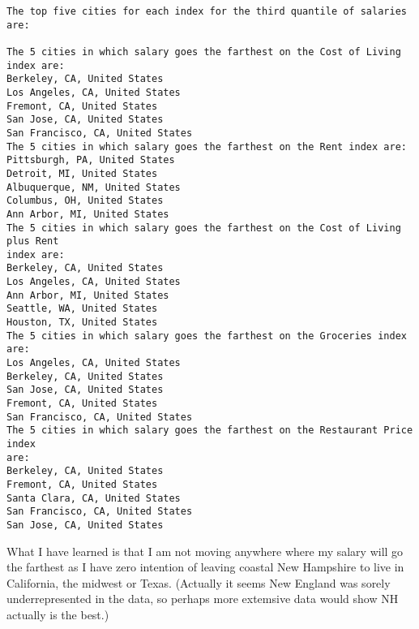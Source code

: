 \documentclass[11pt]{article}
\begin{document}
    \begin{Verbatim}[commandchars=\\\{\}]
The top five cities for each index for the third quantile of salaries are:

The 5 cities in which salary goes the farthest on the Cost of Living index are:
Berkeley, CA, United States
Los Angeles, CA, United States
Fremont, CA, United States
San Jose, CA, United States
San Francisco, CA, United States
The 5 cities in which salary goes the farthest on the Rent index are:
Pittsburgh, PA, United States
Detroit, MI, United States
Albuquerque, NM, United States
Columbus, OH, United States
Ann Arbor, MI, United States
The 5 cities in which salary goes the farthest on the Cost of Living plus Rent
index are:
Berkeley, CA, United States
Los Angeles, CA, United States
Ann Arbor, MI, United States
Seattle, WA, United States
Houston, TX, United States
The 5 cities in which salary goes the farthest on the Groceries index are:
Los Angeles, CA, United States
Berkeley, CA, United States
San Jose, CA, United States
Fremont, CA, United States
San Francisco, CA, United States
The 5 cities in which salary goes the farthest on the Restaurant Price index
are:
Berkeley, CA, United States
Fremont, CA, United States
Santa Clara, CA, United States
San Francisco, CA, United States
San Jose, CA, United States
    \end{Verbatim}

    What I have learned is that I am not moving anywhere where my salary
will go the farthest as I have zero intention of leaving coastal New
Hampshire to live in California, the midwest or Texas. (Actually it
seems New England was sorely underrepresented in the data, so perhaps
more extemsive data would show NH actually is the best.)


    
    
    
\end{document}
